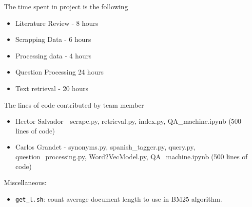 \documentclass[letterpaper, margin=1in]{article}
\begin{document}
The time spent in project is the following
\begin{itemize}
\item Literature Review - 8 hours 
\item Scrapping Data - 6 hours 
\item Processing data - 4 hours
\item Question Processing 24 hours 
\item Text retrieval - 20 hours 
\end{itemize}

The lines of code contributed by team member
\begin{itemize}
\item Hector Salvador - scrape.py, retrieval.py, index.py, QA_machine.ipynb (500 lines of code)
\item Carlos Grandet - synonyms.py, spanish_tagger.py, query.py, question_processing.py,
Word2VecModel.py, QA_machine.ipynb (500 lines of code)
\end{itemize}

Miscellaneous:
\begin{itemize}
\item \texttt{get{\_}l.sh}: count average document length to use in BM25 algorithm.
\end{itemize}
\end{document}
